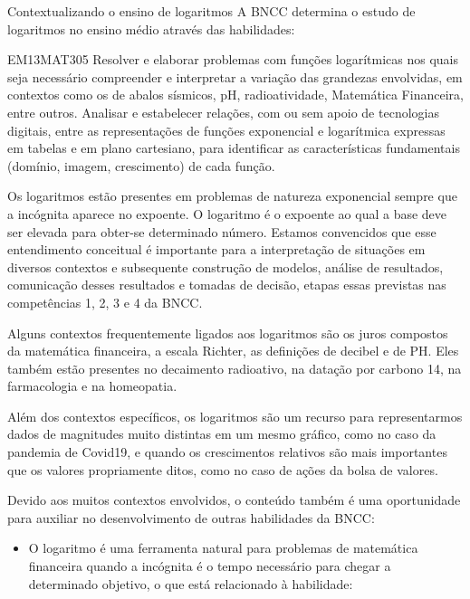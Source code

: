 \mainmatter

\begin{apresentacao}{Contextualizando o ensino de logaritmos}
A BNCC determina o estudo de logaritmos no ensino médio através das habilidades:

\begin{habilities}{EM13MAT305}
Resolver e elaborar problemas com funções logarítmicas nos quais seja necessário compreender e interpretar a variação das grandezas envolvidas, em contextos como os de abalos sísmicos, pH, radioatividade, Matemática Financeira, entre outros.
Analisar e estabelecer relações, com ou sem apoio de tecnologias digitais, entre as representações de funções exponencial e logarítmica expressas em tabelas e em plano cartesiano, para identificar as características fundamentais (domínio, imagem, crescimento) de cada função.
\end{habilities}

Os logaritmos estão presentes em problemas de natureza exponencial sempre que a incógnita aparece no expoente. O logaritmo é o expoente ao qual a base deve ser elevada para obter-se determinado número. Estamos convencidos que esse entendimento conceitual é importante para a interpretação de situações em diversos contextos e subsequente construção de modelos, análise de resultados, comunicação desses resultados e  tomadas de decisão, etapas essas previstas nas competências 1, 2, 3 e 4 da BNCC.


Alguns contextos frequentemente ligados aos logaritmos são os juros compostos da matemática financeira, a escala Richter, as definições de decibel e de PH. Eles também estão presentes no decaimento radioativo, na datação por carbono 14, na farmacologia e na homeopatia.

Além dos contextos específicos, os logaritmos são um recurso para representarmos dados de magnitudes muito distintas em um mesmo gráfico, como no caso da pandemia de Covid19, e quando os crescimentos relativos são mais importantes que os valores propriamente ditos, como no caso de ações da bolsa de valores.

Devido aos muitos contextos envolvidos, o conteúdo também é uma oportunidade para auxiliar no desenvolvimento de outras habilidades da BNCC:
\begin{itemize}
\item O logaritmo é uma ferramenta natural para problemas de matemática financeira quando a incógnita é o tempo necessário para chegar a determinado objetivo, o que está relacionado à habilidade:
\end{itemize}


\end{apresentacao}
